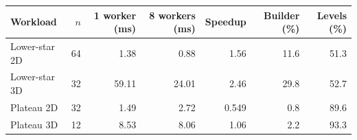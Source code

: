\begin{tabular}{lrrrrrr}
\hline
Workload & $n$ & 1 worker (ms) & 8 workers (ms) & Speedup & Builder (\%) & Levels (\%) \\
\hline
Lower-star 2D & 64 & 1.38 & 0.88 & 1.56 & 11.6 & 51.3 \\
Lower-star 3D & 32 & 59.11 & 24.01 & 2.46 & 29.8 & 52.7 \\
Plateau 2D & 32 & 1.49 & 2.72 & 0.549 & 0.8 & 89.6 \\
Plateau 3D & 12 & 8.53 & 8.06 & 1.06 & 2.2 & 93.3 \\
\hline
\end{tabular}
